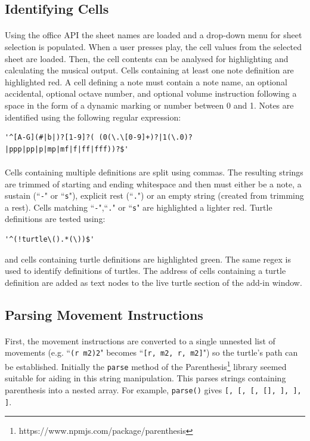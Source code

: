 \subsection{Identifying Cells}

\paragraph{} Using the office API the sheet names are loaded and a drop-down menu for sheet selection is populated. When a user presses play, the cell values from the selected sheet are loaded. Then, the cell contents can be analysed for highlighting and calculating the musical output. Cells containing at least one note definition are highlighted red. A cell defining a note must contain a note name, an optional accidental, optional octave number, and optional volume instruction following a space in the form of a dynamic marking or number between 0 and 1. Notes are identified using the following regular expression:

\begin{verbatim}
'^[A-G](#|b|)?[1-9]?( (0(\.\[0-9]+)?|1(\.0)?|ppp|pp|p|mp|mf|f|ff|fff))?$'
\end{verbatim}

\paragraph{} Cells containing multiple definitions are split using commas. The resulting strings are trimmed of starting and ending whitespace and then must either be a note, a sustain (``\texttt{-}" or ``\texttt{s}"), explicit rest (``\texttt{.}") or an empty string (created from trimming a rest). Cells matching ``\texttt{-}",``\texttt{.}" or ``\texttt{s}" are highlighted a lighter red. Turtle definitions are tested using:
\begin{verbatim}
'^(!turtle\().*(\))$'
\end{verbatim}
and cells containing turtle definitions are highlighted green. The same regex is used to identify definitions of turtles. The address of cells containing a turtle definition are added as text nodes to the live turtle section of the add-in window.

\subsection{Parsing Movement Instructions}

\paragraph{} First, the movement instructions are converted to a single unnested list of movements (e.g. ``\texttt{(r m2)2}" becomes ``\texttt{[r, m2, r, m2]}") so the turtle's path can be established. Initially  the \texttt{parse} method of the Parenthesis\footnote{https://www.npmjs.com/package/parenthesis} library seemed suitable for aiding in this string manipulation. This parses strings containing parenthesis into a nested array. For example, \texttt{parse()} gives \texttt{[, [\upquote{b[}, [, [], \upquote{\}}], \upquote{]}], \upquote{)}]}.

